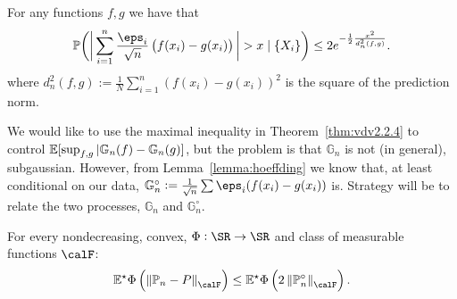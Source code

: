 \begin{example*}
	For any functions \(f,g\) we have that
	\[
		\P\bigg(\bigg|\sum_{i=1}^n \frac{\eps_i}{\sqrt{n}}\left(f(x_i)-g(x_i)\right)\bigg| > x \mid \{X_i\}  \bigg) \leq 2e^{-\frac{1}{2}\frac{x^2}{d_n^2(f,g)}  }
	.\]
	where \(d_n^2(f,g):=\frac{1}{N}\sum_{i=1}^n \left(f(x_i)-g(x_i)\right)^2 \) is the square of the prediction norm.
\end{example*}

We would like to use the maximal inequality in Theorem~\ref{thm:vdv2.2.4} to control \(\mathbb{E}[\sup_{f,g}|\mathbb{G}_n(f)-\mathbb{G}_n(g)]\), but the problem is that \(\mathbb{G}_n\) is not (in general), subgaussian. However, from Lemma~\ref{lemma:hoeffding} we know that, at least conditional on our data, \(\mathbb{G}^\circ_n :=\frac{1}{\sqrt{n}}\sum \eps_i(f(x_i)-g(x_i)) \) is. Strategy will be to relate the two processes, \(\mathbb{G}_n\) and \(\mathbb{G}^\circ_n\).

\begin{lemma}[Symmetrization]
	\label{lemma:vdv2.3.1}
	For every nondecreasing, convex, \(\Phi:\SR\to\SR\) and class of measurable functions \(\calF\):
	\[
	    \E^\star\Phi\left(\left\|\P_n-P\right\|_\calF\right)\leq \E^\star\Phi\left(2\left\|\P_n^\circ\right\|_\calF\right)
	.\] 
\end{lemma}
